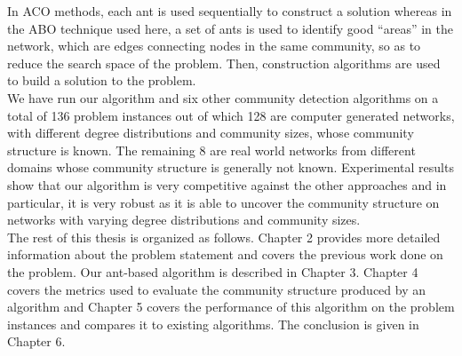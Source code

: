 \begin{spacing}{1.5}
\indent In ACO methods, each ant is used sequentially to construct a solution whereas in the ABO technique used here, a set of ants is used to identify good ``areas'' in the network, which are edges connecting nodes in the same community, so as to reduce the search space of the problem. Then, construction algorithms are used to build a solution to the problem.\\
\indent We have run our algorithm and six other community detection algorithms on a total of 136 problem instances out of which 128 are computer generated networks, with different degree distributions and community sizes, whose community structure is known. The remaining 8 are real world networks from different domains whose community structure is generally not known. Experimental results show that our algorithm is very competitive against the other approaches and in particular, it is very robust as it is able to uncover the community structure on networks with varying degree distributions and community sizes. \\
\indent The rest of this thesis is organized as follows. Chapter 2 provides more detailed information about the problem statement and covers the previous work done on the problem. Our ant-based algorithm is described in Chapter 3. Chapter 4 covers the metrics used to evaluate the community structure produced by an algorithm and Chapter 5 covers the performance of this algorithm on the problem instances and compares it to existing algorithms. The conclusion is given in Chapter 6.
\end{spacing}